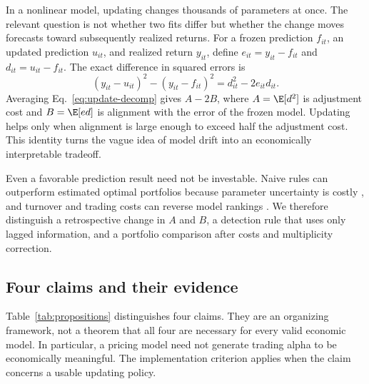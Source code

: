 In a nonlinear model, updating changes thousands of parameters at once. The relevant question is not whether two fits differ but whether the change moves forecasts toward subsequently realized returns. For a frozen prediction $f_{it}$, an updated prediction $u_{it}$, and realized return $y_{it}$, define $e_{it}=y_{it}-f_{it}$ and $d_{it}=u_{it}-f_{it}$. The exact difference in squared errors is
\begin{equation}
 (y_{it}-u_{it})^2-(y_{it}-f_{it})^2=d_{it}^2-2e_{it}d_{it}.
 \label{eq:update-decomp}
\end{equation}
Averaging Eq.~\eqref{eq:update-decomp} gives $A-2B$, where $A=\E[d^2]$ is adjustment cost and $B=\E[ed]$ is alignment with the error of the frozen model. Updating helps only when alignment is large enough to exceed half the adjustment cost. This identity turns the vague idea of model drift into an economically interpretable tradeoff.

Even a favorable prediction result need not be investable. Naive rules can outperform estimated optimal portfolios because parameter uncertainty is costly \citep{demiguel2009optimal}, and turnover and trading costs can reverse model rankings \citep{detzel2023costs}. We therefore distinguish a retrospective change in $A$ and $B$, a detection rule that uses only lagged information, and a portfolio comparison after costs and multiplicity correction.

\subsection{Four claims and their evidence}

Table~\ref{tab:propositions} distinguishes four claims. They are an organizing framework, not a theorem that all four are necessary for every valid economic model. In particular, a pricing model need not generate trading alpha to be economically meaningful. The implementation criterion applies when the claim concerns a usable updating policy.


